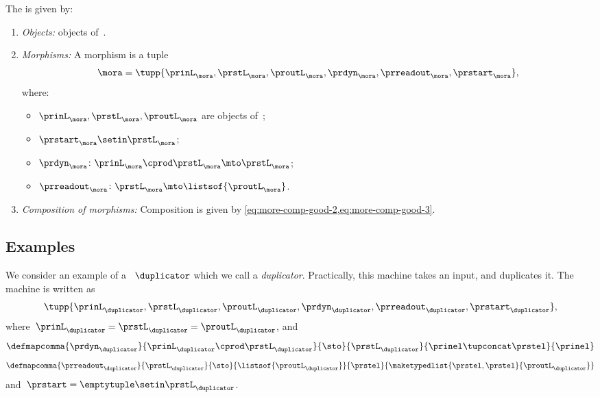 \begin{definition}[\More]
    \label{def:More}
    The  \More is given by:
    \begin{enumerate}
        \item \emph{Objects:} objects of~\SetL.
        \item \emph{Morphisms:}
              A morphism is a tuple
              \begin{equation}
                  \mora = \tupp{\prinL_{\mora},\prstL_{\mora}, \proutL_{\mora},\prdyn_{\mora},\prreadout_{\mora},\prstart_{\mora}},
              \end{equation}
              where:
              \begin{itemize}
                  \item $\prinL_{\mora},\prstL_{\mora}, \proutL_{\mora}$ are objects of~\SetL;
                  \item $\prstart_{\mora} \setin \prstL_{\mora}$;
                  \item $ \prdyn_{\mora} \colon \prinL_{\mora} \cprod \prstL_{\mora} \mto \prstL_{\mora}$;
                  \item $ \prreadout_{\mora} \colon \prstL_{\mora}  \mto \listsof{\proutL_{\mora}}$.
              \end{itemize}
        \item \emph{Composition of morphisms:}
              Composition is given by \cref{eq:more-comp-good-2,eq:more-comp-good-3}.
    \end{enumerate}
\end{definition}

\subsection{Examples}

\begin{example}[Duplicator]
    We consider an example of a ~$\duplicator$ which we call a \emph{duplicator}.
    Practically, this machine takes an input, and duplicates it.
    The machine is written as
    \begin{equation}
        \tupp{\prinL_{\duplicator},\prstL_{\duplicator},\proutL_{\duplicator},\prdyn_{\duplicator},\prreadout_{\duplicator},\prstart_{\duplicator}},
    \end{equation}
    where~$\prinL_{\duplicator}=\prstL_{\duplicator}=\proutL_\duplicator$, and
    \begin{equation}
        \defmapcomma{\prdyn_\duplicator}
        {\prinL_\duplicator \cprod \prstL_\duplicator}
        {\sto}
        {\prstL_\duplicator}
        {\prinel \tupconcat \prstel}
        {\prinel}
    \end{equation}
    \begin{equation}
        \defmapcomma{\prreadout_\duplicator}
        {\prstL_\duplicator}
        {\sto}
        {\listsof{\proutL_\duplicator}}
        {\prstel}
        {\maketypedlist{\prstel,\prstel}{\proutL_\duplicator}}
    \end{equation}
    and~$\prstart=\emptytuple \setin \prstL_\duplicator$.
\end{example}

